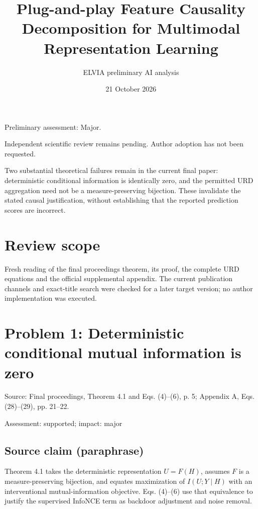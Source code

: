 \documentclass[11pt]{article}
\begin{document}
\title{Plug-and-play Feature Causality Decomposition for Multimodal Representation Learning}

\author{ELVIA preliminary AI analysis}\date{21 October 2026}\maketitle

Preliminary assessment: Major.\par

Independent scientific review remains pending. Author adoption has not been requested.

Two substantial theoretical failures remain in the current final paper: deterministic conditional information is identically zero, and the permitted URD aggregation need not be a measure-preserving bijection. These invalidate the stated causal justification, without establishing that the reported prediction scores are incorrect.

\section*{Review scope}

Fresh reading of the final proceedings theorem, its proof, the complete URD equations and the official supplemental appendix. The current publication channels and exact-title search were checked for a later target version; no author implementation was executed.

\section*{Problem 1: Deterministic conditional mutual information is zero}

Source: Final proceedings, Theorem 4.1 and Eqs. (4)–(6), p. 5; Appendix A, Eqs. (28)–(29), pp. 21–22.

Assessment: supported; impact: major

\subsection*{Source claim (paraphrase)}

Theorem 4.1 takes the deterministic representation \(U=F(H)\), assumes \(F\) is a measure-preserving bijection, and equates maximization of \(I(U;Y\mid H)\) with an interventional mutual-information objective. Eqs. (4)–(6) use that equivalence to justify the supervised InfoNCE term as backdoor adjustment and noise removal.
\end{document}
